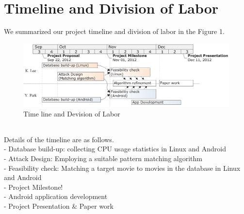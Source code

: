 \section{Timeline and Division of Labor}
\label{sec:timeline}
\indent We summarized our project timeline and division of labor in the Figure 1.\\
\begin{figure}[!ht]
\centering
\includegraphics[scale=1]{Timeline}
\caption{Time line and Devision of Labor}
\end{figure}\\
Details of the timeline are as follows. \\
- Database build-up: collecting CPU usage statistics in Linux and Android\\
- Attack Design: Employing a suitable pattern matching algorithm\\
- Feasibility check: Matching a target movie to movies in the database in Linux and Android \\
- Project Milestone!\\
- Android application development\\
- Project Presentation \& Paper work
